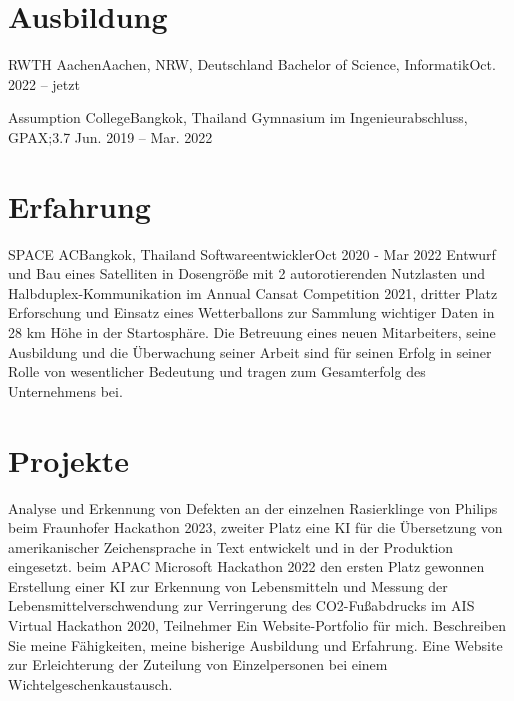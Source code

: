 \section{Ausbildung}
\resumeSubHeadingListStart
\resumeSubheading
{RWTH Aachen}{Aachen, NRW, Deutschland}
{Bachelor of Science, Informatik}{Oct. 2022 -- jetzt}

\resumeSubheading
{Assumption College}{Bangkok, Thailand}
{Gymnasium im Ingenieurabschluss, GPAX;3.7 }{ Jun. 2019 -- Mar. 2022}
\resumeSubHeadingListEnd


\section{Erfahrung}
\resumeSubHeadingListStart

\resumeSubheading
{SPACE AC}{Bangkok, Thailand}
{Softwareentwickler}{Oct 2020 - Mar 2022}
\resumeItemListStart
{}
{Entwurf und Bau eines Satelliten in Dosengröße mit 2 autorotierenden Nutzlasten und Halbduplex-Kommunikation im Annual Cansat Competition 2021, dritter Platz}
{Erforschung und Einsatz eines Wetterballons zur Sammlung wichtiger Daten in 28 km Höhe in der Startosphäre.}
{Die Betreuung eines neuen Mitarbeiters, seine Ausbildung und die Überwachung seiner Arbeit sind für seinen Erfolg in seiner Rolle von wesentlicher Bedeutung und tragen zum Gesamterfolg des Unternehmens bei.}
\resumeItemListEnd



\resumeSubHeadingListEnd


\section{Projekte}
\resumeSubHeadingListStart
{}
{Analyse und Erkennung von Defekten an der einzelnen Rasierklinge von Philips beim Fraunhofer Hackathon 2023, zweiter Platz}
{eine KI für die Übersetzung von amerikanischer Zeichensprache in Text entwickelt und in der Produktion eingesetzt. beim APAC Microsoft Hackathon 2022 den ersten Platz gewonnen}
{Erstellung einer KI zur Erkennung von Lebensmitteln und Messung der Lebensmittelverschwendung zur Verringerung des CO2-Fußabdrucks im AIS Virtual Hackathon 2020, Teilnehmer}
{Ein Website-Portfolio für mich. Beschreiben Sie meine Fähigkeiten, meine bisherige Ausbildung und Erfahrung.}
{Eine Website zur Erleichterung der Zuteilung von Einzelpersonen bei einem Wichtelgeschenkaustausch.}
\resumeSubHeadingListEnd

